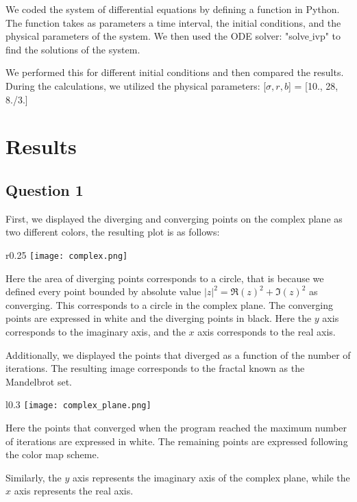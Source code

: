\documentclass{article}
\begin{document}
We coded the system of differential equations by defining a function in Python. The function takes as parameters a time interval, the initial conditions, and the physical parameters of the system. We then used the ODE solver: "solve$\_$ivp" to find the solutions of the system.

We performed this for different initial conditions and then compared the results. During the calculations, we utilized the physical parameters: [$\sigma, r, b$] = [10., 28, 8./3.]

\section{Results}
\subsection{Question 1}
First, we displayed the diverging and converging points on the complex plane as two different colors, the resulting plot is as follows:

\begin{wrapfigure}{r}{0.25\textwidth} %
    \centering
    \texttt{[image: complex.png]}
\end{wrapfigure}

Here the area of diverging points corresponds to a circle, that is because we defined every point bounded by absolute value $|z|^2 = \Re(z)^2 + \Im(z)^2$ as converging. This corresponds to a circle in the complex plane. The converging points are expressed in white and the diverging points in black. Here the $y$ axis corresponds to the imaginary axis, and the $x$ axis corresponds to the real axis.

Additionally, we displayed the points that diverged as a function of the number of iterations. The resulting image corresponds to the fractal known as the Mandelbrot set.

\begin{wrapfigure}{l}{0.3\textwidth} %
    \centering
    \texttt{[image: complex\_plane.png]}
\end{wrapfigure}

 Here the points that converged when the program reached the maximum number of iterations are expressed in white. The remaining points are expressed following the color map scheme.

Similarly, the $y$ axis represents the imaginary axis of the complex plane, while the $x$ axis represents the real axis.
\end{document}

